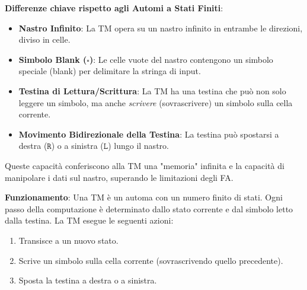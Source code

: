 \documentclass[a4paper]{article}
\newcommand{\blankS}{\ensuremath{\square}}
\begin{document}
\textbf{Differenze chiave rispetto agli Automi a Stati Finiti}:
\begin{itemize}
    \item \textbf{Nastro Infinito}: La TM opera su un nastro infinito in entrambe le direzioni, diviso in celle.
    \item \textbf{Simbolo Blank ($\blankS$)}: Le celle vuote del nastro contengono un simbolo speciale (blank) per delimitare la stringa di input.
    \item \textbf{Testina di Lettura/Scrittura}: La TM ha una testina che può non solo leggere un simbolo, ma anche \emph{scrivere} (sovrascrivere) un simbolo sulla cella corrente.
    \item \textbf{Movimento Bidirezionale della Testina}: La testina può spostarsi a destra ($\texttt{R}$) o a sinistra ($\texttt{L}$) lungo il nastro.
\end{itemize}
Queste capacità conferiscono alla TM una "memoria" infinita e la capacità di manipolare i dati sul nastro, superando le limitazioni degli FA.

\textbf{Funzionamento}:
Una TM è un automa con un numero finito di stati. Ogni passo della computazione è determinato dallo stato corrente e dal simbolo letto dalla testina. La TM esegue le seguenti azioni:
\begin{enumerate}
    \item Transisce a un nuovo stato.
    \item Scrive un simbolo sulla cella corrente (sovrascrivendo quello precedente).
    \item Sposta la testina a destra o a sinistra.
\end{enumerate}
\end{document}
